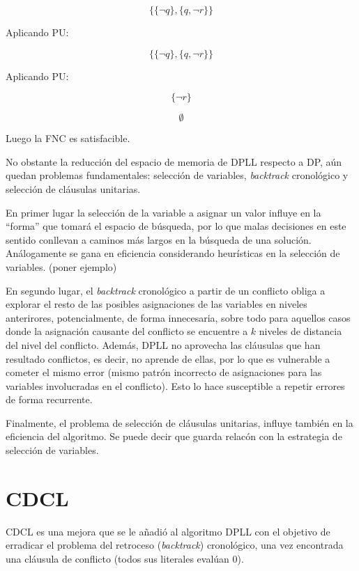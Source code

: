 \begin{equation*}
\{\{\neg q\},\{q,\neg r\}\}
\end{equation*}

Aplicando PU:

\begin{equation*}
\{\{\neg q\},\{q,\neg r\}\}
\end{equation*}

Aplicando PU:

\begin{equation*}
\{\neg r\}
\end{equation*}

\begin{equation*}
\emptyset
\end{equation*}


Luego la FNC es satisfacible.

No obstante la reducción del espacio de memoria de DPLL respecto a DP, aún quedan problemas fundamentales: selección de variables, \textit{backtrack} cronológico y selección de cláusulas unitarias.

En primer lugar la selección de la variable a asignar un valor influye en la ``forma'' que tomará el espacio de búsqueda, por lo que malas decisiones en este sentido conllevan a caminos más largos en la búsqueda de una solución. Análogamente se gana en eficiencia considerando heurísticas en la selección de variables. (poner ejemplo)

En segundo lugar, el \textit{backtrack} cronológico a partir de un conflicto obliga a explorar el resto de las posibles asignaciones de las variables en niveles anterirores, potencialmente, de forma innecesaria, sobre todo para aquellos casos donde la asignación causante del conflicto se encuentre a $k$ niveles de distancia del nivel del conflicto. Además, DPLL no aprovecha las cláusulas que han resultado conflictos, es decir, no aprende de ellas, por lo que es vulnerable a cometer el mismo error (mismo patrón incorrecto de asignaciones para las variables involucradas en el conflicto). Esto lo hace susceptible a repetir errores de forma recurrente.

Finalmente, el problema de selección de cláusulas unitarias, influye también en la eficiencia del algoritmo. Se puede decir que guarda relacón con la estrategia de selección de variables.

\section{CDCL}
CDCL es una mejora que se le añadió al algoritmo DPLL con el objetivo de erradicar el problema del retroceso (\textit{backtrack}) cronológico, una vez encontrada una cláusula de conflicto (todos sus literales evalúan 0).


